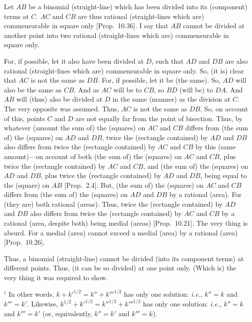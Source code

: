 \begin{Parallel}{}{}
{Let $AB$ be a binomial (straight-line) which has been divided into its
(component) terms at $C$. $AC$ and $CB$ are thus
rational (straight-lines which are) commensurable in square only [Prop.~10.36]. I say that $AB$ cannot be divided
at another point
into two rational (straight-lines which are) commensurable in square only.

For, if possible, let it also have been divided at $D$, such that $AD$ and
$DB$ are also rational (straight-lines which are) commensurable in
square only. So, (it is) clear that $AC$ is not the same as $DB$.
For, if possible, let it be (the same). So, $AD$ will also be the same
as $CB$. And as $AC$ will be to $CB$, so $BD$ (will be) to $DA$.
And $AB$ will (thus) also be divided at $D$ in the same (manner) as the division at $C$. The very opposite was assumed. Thus, $AC$ is not the
same as $DB$. So, on account of this,  points $C$ and $D$ are
not equally far from the point of bisection. Thus, by whatever (amount the sum of) the (squares) on $AC$ and $CB$ differs from (the sum of) the
(squares) on $AD$ and $DB$, twice the (rectangle contained)
by $AD$ and $DB$ also differs from twice the (rectangle contained)
by $AC$ and $CB$ by this (same amount)---on account of both (the sum of) the (squares) on $AC$ and
$CB$, plus twice the (rectangle contained) by $AC$ and $CB$, and
(the sum of) the (squares) on $AD$ and $DB$, plus twice the
(rectangle contained) by $AD$ and $DB$,  being equal to the (square) on $AB$ [Prop.~2.4]. But, (the sum of) the
(squares) on  $AC$ and $CB$ differs from (the sum of) the (squares)
on $AD$ and $DB$ by a rational (area). For (they are) both rational (areas).
Thus, twice the (rectangle contained) by $AD$ and $DB$ also differs from
twice the (rectangle contained) by $AC$ and $CB$ by a
rational (area, despite both) being medial (areas) [Prop.~10.21]. The very thing is absurd. For a
medial (area) cannot exceed a medial (area) by a rational (area) [Prop.~10.26].

Thus, a binomial (straight-line) cannot be divided (into its component terms) at different points.
Thus, (it can be so divided) at one point only. (Which is) the very thing it
was required to show.}
\end{Parallel}
{\footnotesize\noindent$^\dag$ In other words, $k + k'^{1/2} = k'' + k'''^{1/2}$
has only one solution: {\em i.e.}, $k''=k$ and $k'''=k'$. Likewise,
$k^{1/2} + k'^{1/2} = k''^{1/2}+ k'''^{1/2}$ has only one solution:
{\em i.e.}, $k''=k$ and $k'''=k'$ (or, equivalently, $k''=k'$ and $k'''=k$).}

